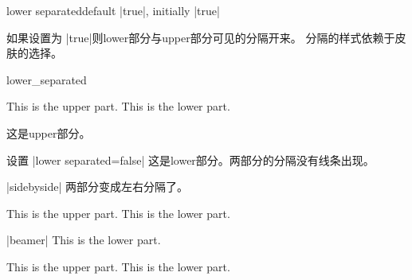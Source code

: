 \begin{docTcbKey}{lower separated}{}{default |true|, initially |true|}
  
  如果设置为 |true|则lower部分与upper部分可见的分隔开来。
  分隔的样式依赖于皮肤的选择。
  \enlargethispage*{1cm}
  \begin{exdispExample}{lower_separated}
  \begin{tcbraster}[colback=red!5!white,colframe=red!75!black,
  fonttitle=\bfseries,fontlower=\itshape]
  \begin{tcolorbox}[title=Lower separated]
  This is the upper part.
  \tcblower
  This is the lower part.
  \end{tcolorbox}
  \begin{tcolorbox}[title=Lower not separated,lower separated=false]
  这是upper部分。
  
  设置 |lower separated=false|
  \tcblower
  这是lower部分。两部分的分隔没有线条出现。
  \end{tcolorbox}
  \begin{tcolorbox}[sidebyside,title=Lower separated]
  |sidebyside|
  \tcblower
  两部分变成左右分隔了。
  \end{tcolorbox}
  \begin{tcolorbox}[sidebyside,title=Lower not separated,lower separated=false]
  This is the upper part.
  \tcblower
  This is the lower part.
  \end{tcolorbox}
  \begin{tcolorbox}[beamer,title=Lower separated]
  |beamer|
  \tcblower
  This is the lower part.
  \end{tcolorbox}
  \begin{tcolorbox}[beamer,title=Lower not separated,lower separated=false]
  This is the upper part.
  \tcblower
  This is the lower part.
  \end{tcolorbox}
  \end{tcbraster}
  \end{exdispExample}
  \end{docTcbKey}




